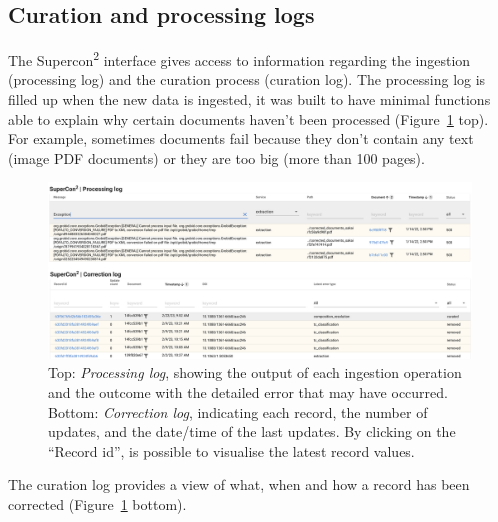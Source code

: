 \subsection{Curation and processing logs}
\label{subsec:curation-and-processing-logs}

The Supercon\textsuperscript{2} interface gives access to information regarding the ingestion (processing log) and the curation process (curation log). 
The processing log is filled up when the new data is ingested, it was built to have minimal functions able to explain why certain documents haven't been processed (Figure~\ref{fig:processing-curation-log} top). 
For example, sometimes documents fail because they don't contain any text (image PDF documents) or they are too big (more than 100 pages). 

\begin{figure}[ht]
  \centering
  \includegraphics[width=1\textwidth]{figures/curation/processing-curation-log.png} 
  \caption{Top: \textit{Processing log}, showing the output of each ingestion operation and the outcome with the detailed error that may have occurred. Bottom: \textit{Correction log}, indicating each record, the number of updates, and the date/time of the last updates. By clicking on the ``Record id'', is possible to visualise the latest record values.}
  \label{fig:processing-curation-log}
\end{figure}

The curation log provides a view of what, when and how a record has been corrected (Figure~\ref{fig:processing-curation-log} bottom).

